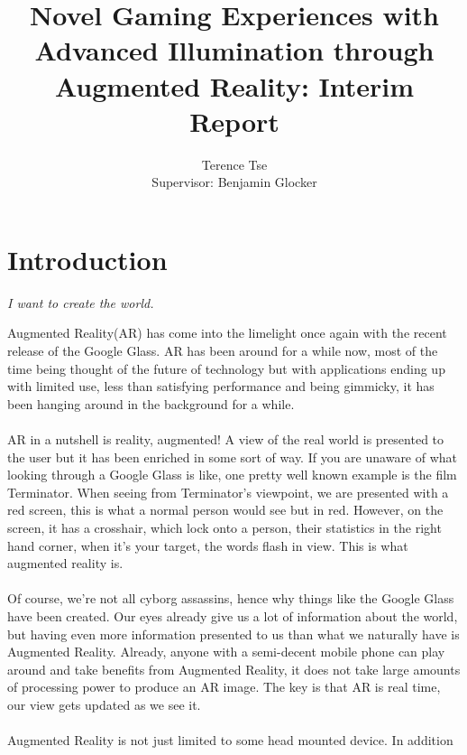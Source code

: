 \documentclass[11pt]{report}
\begin{document}
\title{Novel Gaming Experiences with Advanced Illumination 
through Augmented Reality: Interim Report}
\author{Terence Tse \\
		Supervisor: Benjamin Glocker}
\maketitle
\newpage

\newpage


\section*{Introduction}
\begin{center}
\textit{I want to create the world.}
\end{center}

Augmented Reality(AR) has come into the limelight once again with the recent release
of the Google Glass. AR has been around for a while now, most of the time being
thought of the future of technology but with applications ending up with 
limited use, less than satisfying performance and being gimmicky, it has been
hanging around in the background for a while.
\\ \\
AR in a nutshell is reality, augmented! A view of the real world is presented
to the user but it has been enriched in some sort of way. If you are unaware
of what looking through a Google Glass is like, one pretty well known example 
is the film Terminator. When seeing from Terminator's viewpoint, we are 
presented with a red screen, this is what a normal person would see but in red.
However, on the screen, it has a crosshair, which lock onto a person, their
statistics in the right hand corner, when it's your target, the words flash
in view. This is what augmented reality is.
\\ \\
Of course, we're not all cyborg assassins, hence why things like the Google 
Glass have been created. Our eyes already give us a lot of information about 
the world, but having even more information presented to us than what we
naturally have is Augmented Reality. Already, anyone with a semi-decent mobile
phone can play around and take benefits from Augmented Reality, it does not take
large amounts of processing power to produce an AR image. The key is that AR is
real time, our view gets updated as we see it. 
\\ \\
Augmented Reality is not just limited to some head mounted device. In addition
\end{document}
